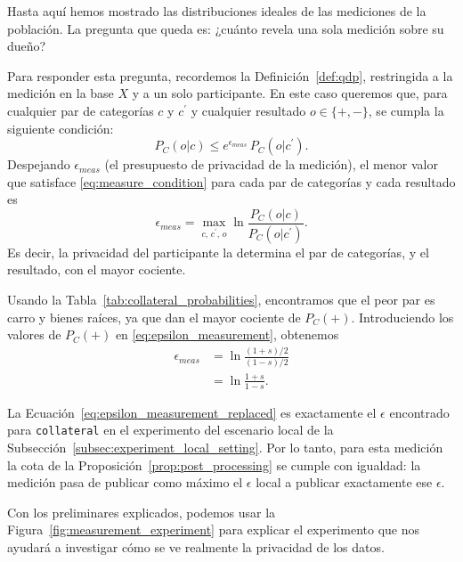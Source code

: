\documentclass{ieeeaccess}
\begin{document}
Hasta aquí hemos mostrado las distribuciones ideales de las mediciones de la población. La pregunta que queda es: ¿cuánto revela una sola medición sobre su dueño?

Para responder esta pregunta, recordemos la Definición~\ref{def:qdp}, restringida a la medición en la base $X$ y a un solo participante. En este caso queremos que, para cualquier par de categorías $c$ y $c^{\prime}$ y cualquier resultado $o \in \{+, -\}$, se cumpla la siguiente condición:
\begin{equation}
  P_C(o|c) \leq e^{\epsilon_{meas}}\, P_C(o|c^{\prime}).
  \label{eq:measure_condition}
\end{equation}
Despejando $\epsilon_{meas}$ (el presupuesto de privacidad de la medición), el menor valor que satisface \eqref{eq:measure_condition} para cada par de categorías y cada resultado es
\begin{equation}
  \epsilon_{meas} = \max_{c,\, c^{\prime},\, o} \ln\frac{P_C(o|c)}{P_C(o|c^{\prime})}.
  \label{eq:epsilon_measurement}
\end{equation}
Es decir, la privacidad del participante la determina el par de categorías, y el resultado, con el mayor cociente.

Usando la Tabla~\ref{tab:collateral_probabilities}, encontramos que el peor par es carro y bienes raíces, ya que dan el mayor cociente de $P_C(+)$. Introduciendo los valores de $P_C(+)$ en \eqref{eq:epsilon_measurement}, obtenemos
\begin{align}
  \epsilon_{meas} &= \ln\frac{(1+s)/2}{(1-s)/2} \nonumber \\
                  &= \ln\frac{1+s}{1-s}.
  \label{eq:epsilon_measurement_replaced}
\end{align}

La Ecuación~\eqref{eq:epsilon_measurement_replaced} es exactamente el $\epsilon$ encontrado para \texttt{collateral} en el experimento del escenario local de la Subsección~\ref{subsec:experiment_local_setting}. Por lo tanto, para esta medición la cota de la Proposición~\ref{prop:post_processing} se cumple con igualdad: la medición pasa de publicar como máximo el $\epsilon$ local a publicar exactamente ese $\epsilon$.

Con los preliminares explicados, podemos usar la Figura~\ref{fig:measurement_experiment} para explicar el experimento que nos ayudará a investigar cómo se ve realmente la privacidad de los datos.
\end{document}
